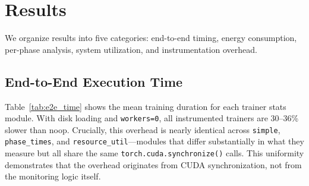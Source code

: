 \documentclass[10pt,twocolumn]{article}
\begin{document}
\section{Results}

We organize results into five categories: end-to-end timing, energy consumption, per-phase analysis, system utilization, and instrumentation overhead.

\subsection{End-to-End Execution Time}

Table~\ref{tab:e2e_time} shows the mean training duration for each trainer stats module. With disk loading and \texttt{workers=0}, all instrumented trainers are 30--36\% slower than noop. Crucially, this overhead is nearly identical across \texttt{simple}, \texttt{phase\_times}, and \texttt{resource\_util}---modules that differ substantially in what they measure but all share the same \texttt{torch.cuda.synchronize()} calls. This uniformity demonstrates that the overhead originates from CUDA synchronization, not from the monitoring logic itself.
\end{document}
